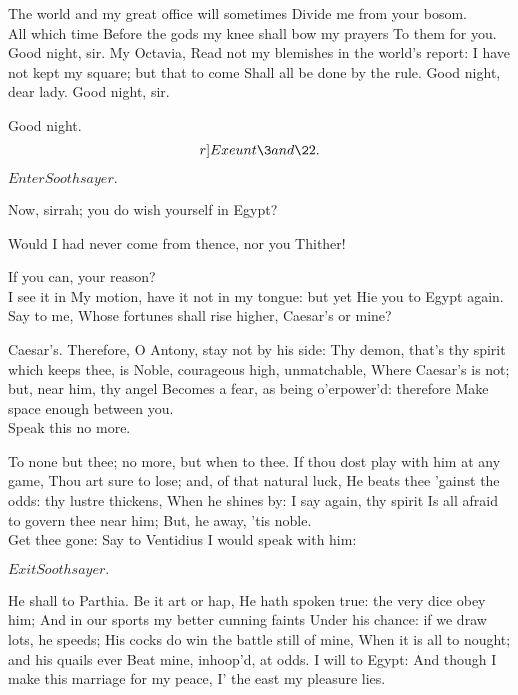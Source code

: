 \documentclass{book}
\begin{document}
\1	The world and my great office will sometimes
	Divide me from your bosom. \\

	All which time
	Before the gods my knee shall bow my prayers
	To them for you. \\

\1	                  Good night, sir. My Octavia,
	Read not my blemishes in the world's report:
	I have not kept my square; but that to come
	Shall all be done by the rule. Good night, dear lady.
	Good night, sir. 

\3	Good night. \[r]Exeunt \3 and \22.\]

	\(Enter Soothsayer.\)

\1	Now, sirrah; you do wish yourself in Egypt?

	Would I had never come from thence, nor you Thither!

\1	If you can, your reason?  \\

	I see it in
	My motion, have it not in my tongue: but yet
	Hie you to Egypt again. \\

\1	Say to me,
	Whose fortunes shall rise higher, Caesar's or mine?

	Caesar's.
	Therefore, O Antony, stay not by his side:
	Thy demon, that's thy spirit which keeps thee, is
	Noble, courageous high, unmatchable,
	Where Caesar's is not; but, near him, thy angel
	Becomes a fear, as being o'erpower'd: therefore
	Make space enough between you. \\

\1	Speak this no more.

	To none but thee; no more, but when to thee.
	If thou dost play with him at any game,
	Thou art sure to lose; and, of that natural luck,
	He beats thee 'gainst the odds: thy lustre thickens,
	When he shines by: I say again, thy spirit
	Is all afraid to govern thee near him;
	But, he away, 'tis noble. \\

\1	Get thee gone:
	Say to Ventidius I would speak with him:

	\(Exit Soothsayer.\)

	He shall to Parthia. Be it art or hap,
	He hath spoken true: the very dice obey him;
	And in our sports my better cunning faints
	Under his chance: if we draw lots, he speeds;
	His cocks do win the battle still of mine,
	When it is all to nought; and his quails ever
	Beat mine, inhoop'd, at odds. I will to Egypt:
	And though I make this marriage for my peace,
	I' the east my pleasure lies. \\
\end{document}
